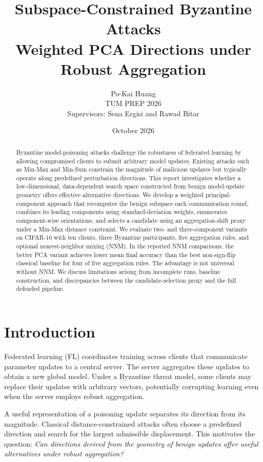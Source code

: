 \documentclass[11pt,a4paper]{article}
\title{\textbf{Subspace-Constrained Byzantine Attacks}\\[5pt]\large Weighted PCA Directions under Robust Aggregation}
\author{Po-Kai Huang\\TUM PREP 2026\\[4pt]\small Supervisors: Sena Ergisi and Rawad Bitar}
\date{October 2026}
\begin{document}
\maketitle
\begin{abstract}
Byzantine model-poisoning attacks challenge the robustness of federated learning by allowing compromised clients to submit arbitrary model updates. Existing attacks such as Min-Max and Min-Sum constrain the magnitude of malicious updates but typically operate along predefined perturbation directions. This report investigates whether a low-dimensional, data-dependent search space constructed from benign model-update geometry offers effective alternative directions. We develop a weighted principal-component approach that recomputes the benign subspace each communication round, combines its leading components using standard-deviation weights, enumerates component-wise orientations, and selects a candidate using an aggregation-shift proxy under a Min-Max distance constraint. We evaluate two- and three-component variants on CIFAR-10 with ten clients, three Byzantine participants, five aggregation rules, and optional nearest-neighbor mixing (NNM). In the reported NNM comparisons, the better PCA variant achieves lower mean final accuracy than the best non-sign-flip classical baseline for four of five aggregation rules. The advantage is not universal without NNM. We discuss limitations arising from incomplete runs, baseline construction, and discrepancies between the candidate-selection proxy and the full defended pipeline.
\end{abstract}

\section{Introduction}
Federated learning (FL) coordinates training across clients that communicate parameter updates to a central server. The server aggregates these updates to obtain a new global model. Under a Byzantine threat model, some clients may replace their updates with arbitrary vectors, potentially corrupting learning even when the server employs robust aggregation.

A useful representation of a poisoning update separates its direction from its magnitude. Classical distance-constrained attacks often choose a predefined direction and search for the largest admissible displacement. This motivates the question: \emph{Can directions derived from the geometry of benign updates offer useful alternatives under robust aggregation?}
\end{document}

